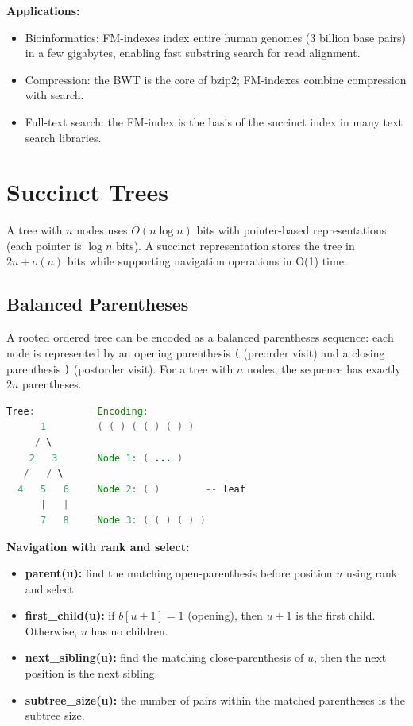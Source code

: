 \textbf{Applications:}
\begin{itemize}
\item Bioinformatics: FM-indexes index entire human genomes (3 billion base pairs) in a few gigabytes, enabling fast substring search for read alignment.
\item Compression: the BWT is the core of bzip2; FM-indexes combine compression with search.
\item Full-text search: the FM-index is the basis of the succinct index in many text search libraries.
\end{itemize}

\section{Succinct Trees}\label{sec22:succinct-trees}

A tree with $n$ nodes uses $O(n \log n)$ bits with pointer-based representations (each pointer is $\log n$ bits). A succinct representation stores the tree in $2n + o(n)$ bits while supporting navigation operations in O(1) time.

\subsection{Balanced Parentheses}

A rooted ordered tree can be encoded as a balanced parentheses sequence: each node is represented by an opening parenthesis \texttt{(} (preorder visit) and a closing parenthesis \texttt{)} (postorder visit). For a tree with $n$ nodes, the sequence has exactly $2n$ parentheses.

\begin{lstlisting}[language=Java]
Tree:           Encoding:
      1         ( ( ) ( ( ) ( ) )
     / \        
    2   3       Node 1: ( ... )
   /   / \      
  4   5   6     Node 2: ( )        -- leaf
      |   |     
      7   8     Node 3: ( ( ) ( ) )
\end{lstlisting}

\textbf{Navigation with rank and select:}
\begin{itemize}
\item \textbf{parent(u):} find the matching open-parenthesis before position $u$ using rank and select.
\item \textbf{first\_child(u):} if $b[u+1] = 1$ (opening), then $u+1$ is the first child. Otherwise, $u$ has no children.
\item \textbf{next\_sibling(u):} find the matching close-parenthesis of $u$, then the next position is the next sibling.
\item \textbf{subtree\_size(u):} the number of pairs within the matched parentheses is the subtree size.
\end{itemize}


